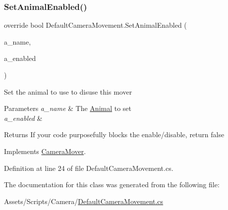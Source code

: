 \subsubsection{\texorpdfstring{Set\+Animal\+Enabled()}{SetAnimalEnabled()}}
{\footnotesize\ttfamily override bool Default\+Camera\+Movement.\+Set\+Animal\+Enabled (\begin{DoxyParamCaption}\item[{\mbox{\hyperlink{_animal_8cs_a2fa5713399b84d1b88dae9196837af50}{A\+N\+I\+M\+A\+L\+\_\+\+N\+A\+ME}}}]{a\+\_\+name,  }\item[{bool}]{a\+\_\+enabled }\end{DoxyParamCaption})\hspace{0.3cm}{\ttfamily [virtual]}}



Set the animal to use to disuse this mover 


\begin{DoxyParams}{Parameters}
{\em a\+\_\+name} & The \mbox{\hyperlink{class_animal}{Animal}} to set\\
\hline
{\em a\+\_\+enabled} & \\
\hline
\end{DoxyParams}
\begin{DoxyReturn}{Returns}
If your code purposefully blocks the enable/disable, return false
\end{DoxyReturn}


Implements \mbox{\hyperlink{class_camera_mover_ae64e8ff4b4850290695f1cf1f7d866ba}{Camera\+Mover}}.



Definition at line 24 of file Default\+Camera\+Movement.\+cs.



The documentation for this class was generated from the following file\+:\begin{DoxyCompactItemize}
\item 
Assets/\+Scripts/\+Camera/\mbox{\hyperlink{_default_camera_movement_8cs}{Default\+Camera\+Movement.\+cs}}\end{DoxyCompactItemize}
